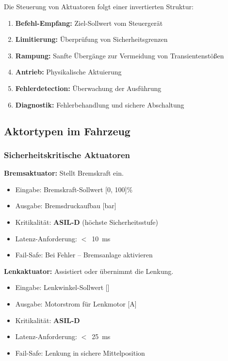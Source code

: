﻿\documentclass[a4paper,12pt]{article}
\begin{document}
Die Steuerung von Aktuatoren folgt einer invertierten Struktur:

\begin{enumerate}
	\item \textbf{Befehl-Empfang:} Ziel-Sollwert vom Steuergerät
	\item \textbf{Limitierung:} Überprüfung von Sicherheitsgrenzen
	\item \textbf{Rampung:} Sanfte Übergänge zur Vermeidung von Transientenstößen
	\item \textbf{Antrieb:} Physikalische Aktuierung
	\item \textbf{Fehlerdetection:} Überwachung der Ausführung
	\item \textbf{Diagnostik:} Fehlerbehandlung und sichere Abschaltung
\end{enumerate}

\subsection{Aktortypen im Fahrzeug}

\subsubsection{Sicherheitskritische Aktuatoren}

\textbf{Bremsaktuator:} Stellt Bremskraft ein.
\begin{itemize}
	\item Eingabe: Bremskraft-Sollwert [0, 100]\%
	\item Ausgabe: Bremsdruckaufbau [bar]
	\item Kritikalität: \textbf{ASIL-D} (höchste Sicherheitsstufe)
	\item Latenz-Anforderung: $<$~10~ms
	\item Fail-Safe: Bei Fehler -- Bremsanlage aktivieren
\end{itemize}

\textbf{Lenkaktuator:} Assistiert oder übernimmt die Lenkung.
\begin{itemize}
	\item Eingabe: Lenkwinkel-Sollwert [\textdegree]
	\item Ausgabe: Motorstrom für Lenkmotor [A]
	\item Kritikalität: \textbf{ASIL-D}
	\item Latenz-Anforderung: $<$~25~ms
	\item Fail-Safe: Lenkung in sichere Mittelposition
\end{itemize}
\end{document}
